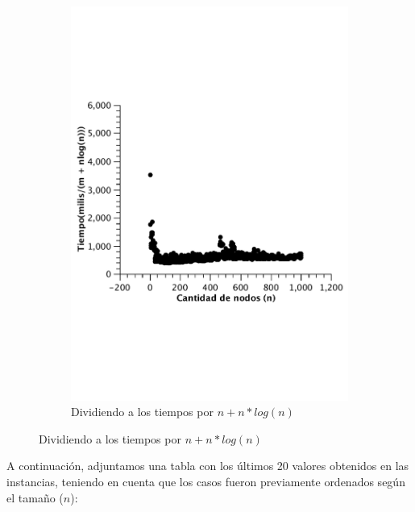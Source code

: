 \begin{figure}[H]
        \begin{subfigure}[b]{0.5\textwidth}
                \includegraphics[width=\textwidth]{imagenes/completo-listas-4.pdf}
                \caption{Dividiendo a los tiempos por $n + n*log(n)$}
        \end{subfigure}
\end{figure}
A continuación, adjuntamos una tabla con los últimos 20 valores obtenidos en las instancias, teniendo en cuenta que los casos fueron previamente ordenados según el tamaño ($n$):

